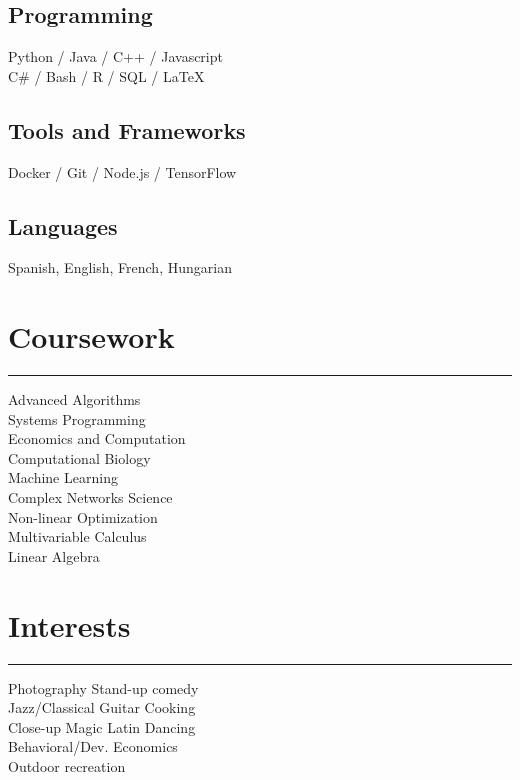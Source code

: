 \documentclass[]{dafirebanks-resume-openfont}
\begin{document}
\begin{minipage}[t]{0.33\textwidth}
\subsection{Programming}
Python / Java / C++ / Javascript \\
C\# / Bash / R / SQL / \LaTeX

\sectionsep 
\subsection{Tools and Frameworks}
Docker / Git / Node.js / TensorFlow
\sectionsep
\subsection{Languages}
Spanish, English, French, Hungarian
\sectionsep 


\section{Coursework}
\vspace{-3pt}
{\color{blue} \hrule width 107pt} \vspace{5pt}
Advanced Algorithms \\
Systems Programming \\
Economics and Computation \\
Computational Biology\\
Machine Learning\\
Complex Networks Science \\
Non-linear Optimization\\
Multivariable Calculus \\
Linear Algebra \\ 
\sectionsep


\section{Interests}
\vspace{-3pt}
{\color{blue}\hrule width 78pt \vspace{5pt}}
Photography \textbullet{} Stand-up comedy \\   
\textbullet{} Jazz/Classical Guitar \textbullet{} Cooking\\ 
Close-up Magic \textbullet{} Latin Dancing \\
\textbullet{} Behavioral/Dev. Economics\\  
 Outdoor recreation


\end{minipage}
\end{document}
